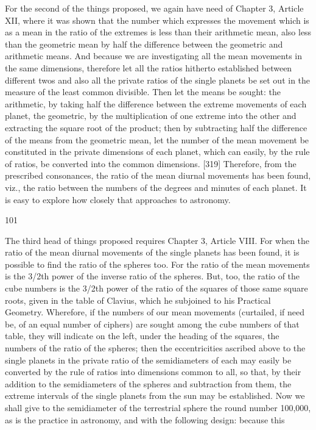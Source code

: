 \documentclass{article}
\begin{document}
For the second of the things proposed, we again have need of Chapter 3,
Article XII, where it was shown that the number which expresses the
movement which is as a mean in the ratio of the extremes is less than
their arithmetic mean, also less than the geometric mean by half the
difference between the geometric and arithmetic means. And because we
are investigating all the mean movements in the same dimensions,
therefore let all the ratios hitherto established between different twos
and also all the private ratios of the single planets be set out in the
measure of the least common divisible. Then let the means be sought:
the arithmetic, by taking half the difference between the extreme
movements of each planet, the geometric, by the multiplication of one
extreme into the other and extracting the square root of the product;
then by subtracting half the difference of the means from the geometric
mean, let the number of the mean movement be constituted in the
private dimensions of each planet, which can easily, by the rule of ratios,
be converted into the common dimensions.
[319] Therefore, from the prescribed consonances, the ratio of the mean
diurnal movements has been found, viz., the ratio between the numbers
of the degrees and minutes of each planet. It is easy to explore how
closely that approaches to astronomy.


101

The third head of things proposed requires Chapter 3, Article VIII. For
when the ratio of the mean diurnal movements of the single planets has
been found, it is possible to find the ratio of the spheres too. For the ratio
of the mean movements is the 3/2th power of the inverse ratio of the
spheres. But, too, the ratio of the cube numbers is the 3/2th power of the
ratio of the squares of those same square roots, given in the table of
Clavius, which he subjoined to his Practical Geometry. Wherefore, if the
numbers of our mean movements (curtailed, if need be, of an equal
number of ciphers) are sought among the cube numbers of that table,
they will indicate on the left, under the heading of the squares, the
numbers of the ratio of the spheres; then the eccentricities ascribed
above to the single planets in the private ratio of the semidiameters of
each may easily be converted by the rule of ratios into dimensions
common to all, so that, by their addition to the semidiameters of the
spheres and subtraction from them, the extreme intervals of the single
planets from the sun may be established. Now we shall give to the
semidiameter of the terrestrial sphere the round number 100,000, as is
the practice in astronomy, and with the following design: because this
\end{document}
